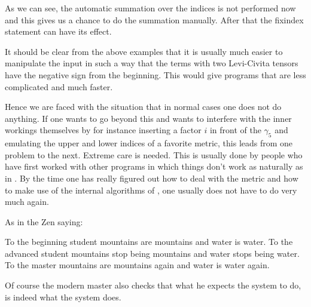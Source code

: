 As we can see, the automatic summation over the indices is not performed 
now and this gives us a chance to do the summation manually. After that the 
fixindex statement can have its effect. \hfill \vspace{2mm}

\noindent It should be clear from the above examples that it is usually 
much easier to manipulate the input in such a way that the terms with two 
Levi-Civita tensors have the negative sign from the beginning. This would 
give programs that are less complicated and much faster. \hfill \vspace{2mm}

\noindent Hence we are faced with the situation that in normal cases one 
does not do anything. If one wants to go beyond this and wants to interfere 
with the inner workings themselves by for instance inserting a factor $i$ 
in front of the $\gamma_5$ and emulating the upper and lower indices of a 
favorite metric, this leads from one problem to the next. Extreme care is 
needed. This is usually done by people who have first worked with other 
programs in which things don't work as naturally as in \FORM. By the time 
one has really figured out how to deal with the metric and how to make use 
of the internal algorithms of \FORM, one usually does not have to do very 
much again. \hfill \vspace{2mm}

\noindent As in the Zen saying: \hfill \vspace{2mm}

\noindent To the beginning student mountains are mountains 
and water is water. To the advanced student 
mountains stop being mountains and water stops being water. To the 
master mountains are mountains again and water is water 
again. \hfill \vspace{2mm}

\noindent Of course the modern master also checks that what he expects the 
system to do, is indeed what the system does.
